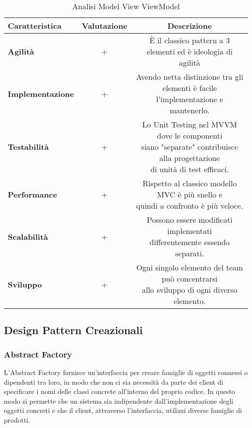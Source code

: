 {{{\begin{itemize}
				\small %
				{\renewcommand\arraystretch{1.2} %
					\begin{center} \begin{table} \begin{tabular}{|l|c|c|}
						\hline
						{\textbf{Caratteristica}}&{\textbf{Valutazione}}&{\textbf{Descrizione}}\\
						\hline
						\textbf{Agilità} & + & È il classico pattern a 3 elementi ed è ideologia di agilità \\
						\hline
						\textbf{Implementazione} & + &  \minitab[c]{Avendo netta distinzione tra gli elementi è facile\\ l'implementazione e mantenerlo.}\\
						\hline
						\textbf{Testabilità} & + &  \minitab[c]{Lo Unit Testing nel MVVM dove le componenti\\ siano "separate" contribuisce alla progettazione\\ di unità di test efficaci.}\\
						\hline
						\textbf{Performance} & + &  \minitab[c]{Rispetto al classico modello MVC è più snello e\\ quindi a confronto è più veloce.}\\
						\hline
						\textbf{Scalabilità} & + &  \minitab[c]{Possono essere modificati implementati\\differentemente essendo separati.} \\
						\hline
						\textbf{Sviluppo} & + &  \minitab[c]{Ogni singolo elemento del team può concentrarsi\\allo sviluppo di ogni diverso elemento.} \\
						\hline
					\end{tabular}
				\caption{Analisi Model View ViewModel}
				\label{AMVVM}
				\end{table}	
			 \end{center}
				}
			\end{itemize}
		}
	}
	\subsection{Design Pattern Creazionali}{
		\subsubsection{Abstract Factory}{
			L'Abstract Factory fornisce un'interfaccia per creare famiglie di oggetti connessi o dipendenti tra loro, in modo che non ci sia necessità da parte dei client di specificare i nomi delle classi concrete all'interno del proprio codice.
			In questo modo si permette che un sistema sia indipendente dall'implementazione degli oggetti concreti e che il client, attraverso l'interfaccia, utilizzi diverse famiglie di prodotti.
			
}}}
